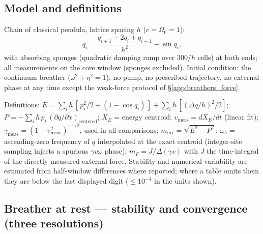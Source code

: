 \documentclass[11pt,a4paper]{article}
\theoremstyle{plain}
\theoremstyle{remark}
\begin{document}
\subsection{Model and definitions}
Chain of classical pendula, lattice spacing $h$ ($c = \Omega_0 = 1$):
\begin{equation}\label{eq:sg_lattice}
\ddot q_i = \frac{q_{i+1} - 2q_i + q_{i-1}}{h^2} - \sin q_i,
\end{equation}
with absorbing sponges (quadratic damping ramp over $300/h$ cells) at both ends; all measurements on the core window (sponges excluded). Initial condition: the continuum breather ($\omega^2 + \eta^2 = 1$); no pump, no prescribed trajectory, no external phase at any time except the weak-force protocol of \S\ref{app:breathers_force}.

Definitions: $E = \sum_i h\,[\,p_i^2/2 + (1-\cos q_i)\,] + \sum_i h\,[(\Delta q/h)^2/2]$; $P = -\sum_i h\, p_i\,(\partial q/\partial x)_{\text{centered}}$; $X_E$ = energy centroid; $v_{\text{meas}} = dX_E/dt$ (linear fit); $\gamma_{\text{meas}} = (1 - v_{\text{meas}}^2)^{-1/2}$, used in all comparisons; $m_{\text{inv}} = \sqrt{E^2 - P^2}$; $\omega_b$ = ascending-zero frequency of $q$ interpolated at the exact centroid (integer-site sampling injects a spurious $\gamma v \omega$ phase); $m_F = J/\Delta(\gamma v)$ with $J$ the time-integral of the directly measured external force. Stability and numerical variability are estimated from half-window differences where reported; where a table omits them they are below the last displayed digit ($\le 10^{-4}$ in the units shown).

\subsection{Breather at rest --- stability and convergence (three resolutions)}
\end{document}
